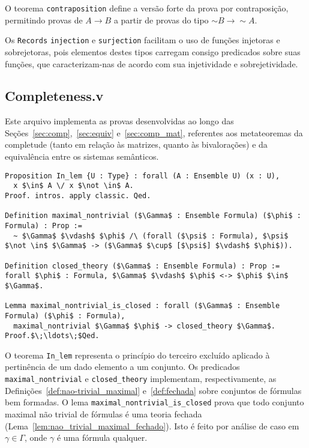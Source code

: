           O teorema \texttt{contraposition} define a versão forte da prova por contraposição, permitindo provas de $A \to B$ a partir de provas do tipo $\sim B \to \sim A$.
          
          Os \texttt{Records} \texttt{injection} e \texttt{surjection} facilitam o uso de funções injetoras e sobrejetoras, pois elementos destes tipos carregam consigo predicados sobre suas funções, que caracterizam-nas de acordo com sua injetividade e sobrejetividade.

    
    \subsection{Completeness.v}\label{sec:completeness}
        
        Este arquivo implementa as provas desenvolvidas ao longo das Seções~\ref{sec:comp},~\ref{sec:equiv} e~\ref{sec:comp_mat}, referentes aos metateoremas da completude (tanto em relação às matrizes, quanto às bivalorações) e da equivalência entre os sistemas semânticos.

        \begin{lstlisting}[name=Completeness, frame=single, language=coq]
Proposition In_lem {U : Type} : forall (A : Ensemble U) (x : U),
  x $\in$ A \/ x $\not \in$ A.
Proof. intros. apply classic. Qed.

Definition maximal_nontrivial ($\Gamma$ : Ensemble Formula) ($\phi$ : Formula) : Prop :=
  ~ $\Gamma$ $\vdash$ $\phi$ /\ (forall ($\psi$ : Formula), $\psi$ $\not \in$ $\Gamma$ -> ($\Gamma$ $\cup$ [$\psi$] $\vdash$ $\phi$)).

Definition closed_theory ($\Gamma$ : Ensemble Formula) : Prop := 
forall $\phi$ : Formula, $\Gamma$ $\vdash$ $\phi$ <-> $\phi$ $\in$ $\Gamma$.

Lemma maximal_nontrivial_is_closed : forall ($\Gamma$ : Ensemble Formula) ($\phi$ : Formula),
  maximal_nontrivial $\Gamma$ $\phi$ -> closed_theory $\Gamma$.
Proof.$\;\ldots\;$Qed.
        \end{lstlisting}

        O teorema \texttt{In\_lem} representa o princípio do terceiro excluído aplicado à pertinência de um dado elemento a um conjunto. Os predicados \texttt{maximal\_nontrivial} e \texttt{closed\_theory} implementam, respectivamente, as Definições~\ref{def:nao-trivial_maximal} e~\ref{def:fechada} sobre conjuntos de fórmulas bem formadas. O lema \texttt{maximal\_nontrivial\_is\_closed} prova que todo conjunto maximal não trivial de fórmulas é uma teoria fechada (Lema~\ref{lem:nao_trivial_maximal_fechado}). Isto é feito por análise de caso em $\gamma \in \Gamma$, onde $\gamma$ é uma fórmula qualquer.

